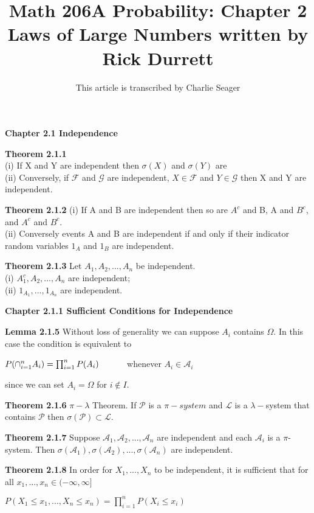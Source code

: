 \documentclass{article}
\newcommand\tab[1][1cm]{\hspace*{#1}}
\begin{document}
\title{Math 206A Probability: Chapter 2 Laws of Large Numbers written by Rick Durrett}
\author{This article is transcribed by Charlie Seager}

\maketitle

\textbf {Chapter 2.1 Independence}

\textbf {Theorem 2.1.1} \\ 
(i) If X and Y are independent then $\sigma(X)$ and $\sigma(Y)$ are \\
(ii) Conversely, if $\mathcal{F}$ and $\mathcal{G}$ are independent, $X \in \mathcal{F}$ and $Y \in \mathcal{G}$ then X and Y are independent.

\textbf {Theorem 2.1.2} (i) If A and B are independent then so are $A^c$ and B, A and $B^c$, and $A^c$ and $B^c$. \\ (ii) Conversely events A and B are independent if and only if their indicator random variables $1_A$ and $1_B$ are independent.

\textbf {Theorem 2.1.3} Let $A_1, A_2,..., A_n$ be independent. \\ (i) $A_1^{c}, A_2 ,..., A_n$ are independent; \\ (ii) $1_{A_1},..., 1_{A_n}$ are independent.

\textbf {Chapter 2.1.1 Sufficient Conditions for Independence}

\textbf {Lemma 2.1.5} Without loss of generality we can suppose $A_i$ contains $\Omega$. In this case the condition is equivalent to
\begin{center}
$P(\cap_{i=1}^n A_i) = \prod_{i=1}^{n} P(A_i) \tab$ whenever $A_i \in \mathcal{A}_{i}$
\end{center}
since we can set $A_i = \Omega$ for $i \not\in  I$.

\textbf {Theorem 2.1.6} $\pi - \lambda$ Theorem. If $\mathcal{P}$ is a $\pi-system$ and $\mathcal{L}$ is a $\lambda-$system that contains $\mathcal{P}$ then $\sigma(\mathcal{P}) \subset \mathcal{L}.$

\textbf {Theorem 2.1.7} Suppose $\mathcal{A}_1, \mathcal{A}_2,..., \mathcal{A}_n$ are independent and each $\mathcal{A}_i$ is a $\pi$-system. Then $\sigma(\mathcal{A}_1), \sigma(\mathcal{A}_2),...,\sigma(\mathcal{A}_n)$ are independent.

\textbf {Theorem 2.1.8} In order for $X_1 ,..., X_n$ to be independent, it is sufficient that for all $x_1 ,..., x_n \in (-\infty, \infty]$
\begin{center}
$P(X_1 \leq x_1 ,..., X_n \leq x_n) = \prod_{i=1}^{n} P(X_i \leq x_i)$
\end{center}
\end{document}
